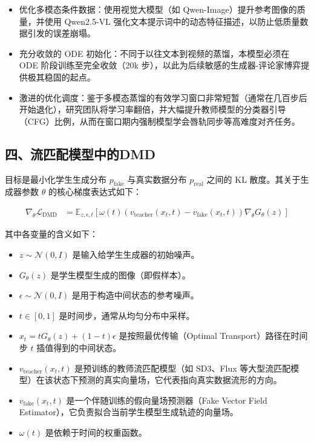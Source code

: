 \begin{itemize}
\tightlist
\item
  优化多模态条件数据：使用视觉大模型（如 Qwen-Image）提升参考图像的质量，并使用 Qwen2.5-VL 强化文本提示词中的动态特征描述，以防止低质量数据引发的误差崩塌。
\item
  充分收敛的 ODE 初始化：不同于以往文本到视频的蒸馏，本模型必须在 ODE 阶段训练至完全收敛（20k 步），以此为后续敏感的生成器-评论家博弈提供极其稳固的起点。
\item
  激进的优化调度：鉴于多模态蒸馏的有效学习窗口非常短暂（通常在几百步后开始退化），研究团队将学习率翻倍，并大幅提升教师模型的分类器引导（CFG）比例，从而在窗口期内强制模型学会唇轨同步等高难度对齐任务。
\end{itemize}

\hypertarget{ux56dbux6d41ux5339ux914dux6a21ux578bux4e2dux7684dmd}{%
\subsection{四、流匹配模型中的DMD}\label{ux56dbux6d41ux5339ux914dux6a21ux578bux4e2dux7684dmd}}

目标是最小化学生生成分布 \(p_{\mathrm{fake}}\) 与真实数据分布 \(p_{\mathrm{real}}\) 之间的 KL 散度。其关于生成器参数 \(\theta\) 的核心梯度表达式如下：

\[
\begin{aligned}
\nabla_\theta\mathcal{L}_{\mathrm{DMD}}
&=
\mathbb{E}_{z,\epsilon,t}\left[
\omega(t)
\left(v_{\mathrm{teacher}}(x_t,t)-v_{\mathrm{fake}}(x_t,t)\right)
\nabla_\theta G_\theta(z)
\right]
\end{aligned}
\]

其中各变量的含义如下：

\begin{itemize}
\tightlist
\item
  \(z\sim\mathcal{N}(0,I)\) 是输入给学生生成器的初始噪声。
\item
  \(G_\theta(z)\) 是学生模型生成的图像（即假样本）。
\item
  \(\epsilon\sim\mathcal{N}(0,I)\) 是用于构造中间状态的参考噪声。
\item
  \(t\in[0,1]\) 是时间步，通常从均匀分布中采样。
\item
  \(x_t=tG_\theta(z)+(1-t)\epsilon\) 是按照最优传输（Optimal Transport）路径在时间步 \(t\) 插值得到的中间状态。
\item
  \(v_{\mathrm{teacher}}(x_t,t)\) 是预训练的教师流匹配模型（如 SD3、Flux 等大型流匹配模型）在该状态下预测的真实向量场，它代表指向真实数据流形的方向。
\item
  \(v_{\mathrm{fake}}(x_t,t)\) 是一个伴随训练的假向量场预测器（Fake Vector Field Estimator），它负责拟合当前学生模型生成轨迹的向量场。
\item
  \(\omega(t)\) 是依赖于时间的权重函数。
\end{itemize}

